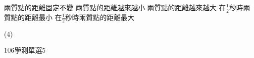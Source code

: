 \begin{QUESTIONS}
\begin{QUESTION}
\begin{QBODY}
			\begin{QOPS}
				\QOP 兩質點的距離固定不變
				\QOP 兩質點的距離越來越小
				\QOP 兩質點的距離越來越大
				\QOP 在$\frac{1}{2}$秒時兩質點的距離最小
				\QOP 在$\frac{1}{2}$秒時兩質點的距離最大
			\end{QOPS}
        \end{QBODY}
        \begin{QFROMS}
        \end{QFROMS}
        \begin{QTAGS}\end{QTAGS}
        \begin{QANS}
            (4)
        \end{QANS}
        \begin{QSOLLIST}
            \begin{QSOL}
                \begin{QSTEPS}
                \end{QSTEPS}
            \end{QSOL}
        \end{QSOLLIST}
        \begin{QEMPTYSPACE}
        \end{QEMPTYSPACE}
    \end{QUESTION}
    \begin{QUESTION}
        \begin{ExamInfo}{106}{學測}{單選}{5}
        \end{ExamInfo}

\end{QUESTION}
\end{QUESTIONS}

